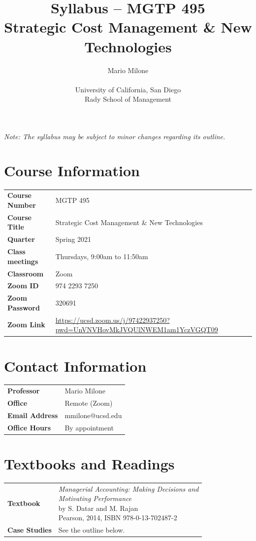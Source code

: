 \documentclass{article}
\title{Syllabus -- MGTP 495 \\ Strategic Cost Management \& New Technologies}
\author{Mario Milone \\ \\
	University of California, San Diego \\
	Rady School of Management}
\date{}
\begin{document}
\maketitle
\thispagestyle{fancy}

\emph{Note: The syllabus may be subject to minor changes regarding its
outline.}

\section*{Course Information}
\begin{tabular}{p{1.5in}l}
\bf{Course Number}	&	MGTP 495 \\
\bf{Course Title}	&	Strategic Cost Management \& New Technologies \\
\bf{Quarter}		&	Spring 2021 \\
\bf{Class meetings}	&	Thursdays, 9:00am to 11:50am \\
\bf{Classroom}		&	Zoom \\
\bf{Zoom ID}		& 	974 2293 7250 \\
\bf{Zoom Password}	&	320691 \\
\bf{Zoom Link}		& 	\url{https://ucsd.zoom.us/j/97422937250?pwd=UnVNVHovMkJVQUlNWEM1am1YczVGQT09} \\
\end{tabular}

\section*{Contact Information}
\begin{tabular}{p{1.5in}l}
\bf{Professor}			&	Mario Milone \\
\bf{Office}					&	Remote (Zoom) \\
\bf{Email Address}	&	mmilone@ucsd.edu \\
\bf{Office Hours}		&	By appointment \\
\end{tabular}

\section*{Textbooks and Readings}
\begin{tabular}[t]{p{1.5in}l}
\bf{Textbook}		&\makecell[l]{\emph{Managerial Accounting: Making
			Decisions and} \\ \emph{Motivating Performance} \\
			by S. Datar and M. Rajan \\
			Pearson, 2014, ISBN 978-0-13-702487-2} \\
\bf{Case Studies}	&	See the outline below. \\
\end{tabular}
\end{document}
